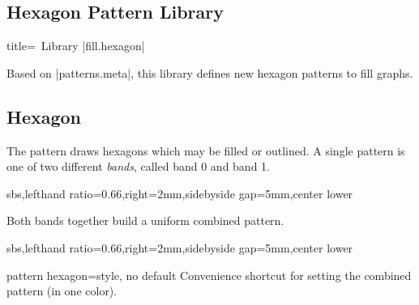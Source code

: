\documentclass[a4paper,11pt]{article}
\begin{document}
\begin{myvoid}
\clearpage
\section{Hexagon Pattern Library}\label{sec:hexagon}%

\begin{dispListing*}{title=\tikzname\ Library |fill.hexagon|}
\usetikzlibrary{fill.hexagon} %
\usepackage{tikzfill.hexagon} %
\end{dispListing*}

Based on |patterns.meta|, this library defines new hexagon patterns to fill graphs.



\subsection{Hexagon}
The  pattern draws hexagons which may be filled or outlined.
A single pattern is one of two different \emph{bands}, called band 0 and band 1.

\begin{dispExample*}{sbs,lefthand ratio=0.66,right=2mm,sidebyside gap=5mm,center lower}
\end{dispExample*}

Both bands together build a uniform combined pattern.

\begin{dispExample*}{sbs,lefthand ratio=0.66,right=2mm,sidebyside gap=5mm,center lower}
\end{dispExample*}

\begin{docTikzKey}{pattern hexagon}{=}{style, no default}
  Convenience shortcut for setting the combined pattern (in one color).


\end{docTikzKey}
\end{myvoid}
\end{document}
